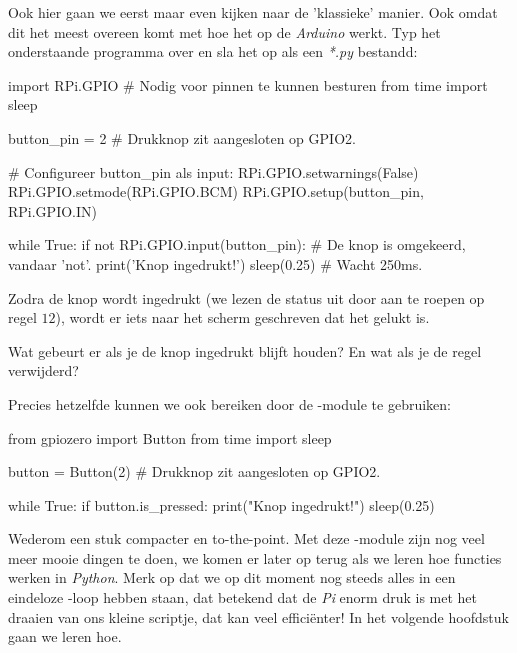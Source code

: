 Ook hier gaan we eerst maar even kijken naar de 'klassieke' manier. Ook omdat dit het meest overeen komt met hoe het op de \textit{Arduino} werkt. Typ het onderstaande programma over en sla het op als een \textit{*.py} bestandd:
\begin{python}
import RPi.GPIO  # Nodig voor pinnen te kunnen besturen
from time import sleep

button_pin = 2  # Drukknop zit aangesloten op GPIO2.

# Configureer button_pin als input:
RPi.GPIO.setwarnings(False)
RPi.GPIO.setmode(RPi.GPIO.BCM)
RPi.GPIO.setup(button_pin, RPi.GPIO.IN)

while True:
    if not RPi.GPIO.input(button_pin):  # De knop is omgekeerd, vandaar 'not'.
        print('Knop ingedrukt!')
        sleep(0.25)                     # Wacht 250ms.
\end{python}


Zodra de knop wordt ingedrukt (we lezen de status uit door  aan te roepen op regel $12$), wordt er iets naar het scherm geschreven dat het gelukt is.

\begin{exercise}
Wat gebeurt er als je de knop ingedrukt blijft houden? En wat als je de  regel verwijderd?
\end{exercise}

Precies hetzelfde kunnen we ook bereiken door de -module te gebruiken:
\begin{python}
from gpiozero import Button
from time import sleep 

button = Button(2)  # Drukknop zit aangesloten op GPIO2.

while True: 
    if button.is_pressed: 
        print("Knop ingedrukt!") 
        sleep(0.25)
\end{python}

Wederom een stuk compacter en to-the-point. Met deze -module zijn nog veel meer mooie dingen te doen, we komen er later op terug als we leren hoe functies werken in \textit{Python}. Merk op dat we op dit moment nog steeds alles in een eindeloze -loop hebben staan, dat betekend dat de \textit{Pi} enorm druk is met het draaien van ons kleine scriptje, dat kan veel efficiënter! In het volgende hoofdstuk gaan we leren hoe.

